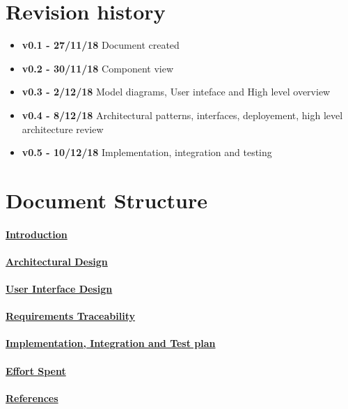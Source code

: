 \section{Revision history}
\begin{itemize}
\item \textbf{v0.1 - 27/11/18} Document created
\item \textbf{v0.2 - 30/11/18} Component view
\item \textbf{v0.3 - 2/12/18} Model diagrams, User inteface and High level overview
\item \textbf{v0.4 - 8/12/18} Architectural patterns, interfaces, deployement, high level architecture review
\item \textbf{v0.5 - 10/12/18} Implementation, integration and testing 
\end{itemize}
\section{Document Structure}
\paragraph{\hyperref[sect:introduction]{Introduction}}
\paragraph{\hyperref[sect:architecturalDesign]{Architectural Design}} 
\paragraph{\hyperref[sect:userInterfaceDesign]{User	 Interface Design}}
\paragraph{\hyperref[sect:requirementsTraceability]{Requirements Traceability}}
\paragraph{\hyperref[sect:implementationIntegrationTestplan]{Implementation, Integration and Test plan}}
\paragraph{\hyperref[sect:effort]{Effort Spent}}
\paragraph{\hyperref[sect:references]{References}} 


